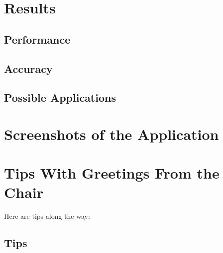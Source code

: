 \documentclass[11pt,
               a4paper,
               bibtotoc,
               idxtotoc,
               headsepline,
               footsepline,
               footexclude,
               BCOR12mm,
               DIV13,
               openany,   %
               ]
               {scrbook}
\begin{document}
\chapter{Results}

\section{Performance}

\section{Accuracy}

\section{Possible Applications} %


\appendix

\chapter{Screenshots of the Application}

\chapter{Tips With Greetings From the Chair}
\label{sec:tips}       %
Here are tips along the way:

\section{Tips}
\end{document}
